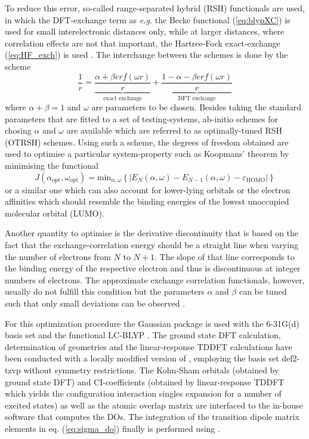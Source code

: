 To reduce this error, so-called range-separated hybrid (RSH) functionals are used, in which the DFT-exchange term as \textit{e.g.} the Becke functional (\ref{eq:blypXC}) is used for small interelectronic distances only, while at larger distances, where correlation effects are not that important, the Hartree-Fock exact-exchange (\ref{eq:HF_exch}) is used \cite{LC-tddft}.
The interchange between the schemes is done by the scheme
\begin{equation}
   \frac 1r = \underbrace{\frac{\alpha +\beta erf(\omega r)}{r}}_{\text{exact exchange}} +\underbrace{\frac{1-\alpha-\beta erf(\omega r)}{r}}_{\text{DFT exchange}}
\end{equation}
where $\alpha+\beta=1$ and $\omega$ are parameters to be chosen.
Besides taking the standard parameters that are fitted to a set of testing-systems, ab-initio schemes for chosing $\alpha$ and $\omega$ are available which are referred to as optimally-tuned RSH (OTRSH) schemes.
Using such a scheme, the degrees of freedom obtained are used to optimise a particular system-property such as Koopmans' theorem by minimising the functional \cite{Bokareva}
\begin{equation}\label{eq:J_ao}
   J(\alpha_\text{opt},\omega_\text{opt})=\text{min}_{\alpha, \omega} \left\{ |E_N(\alpha,\omega)-E_{N-1}(\alpha,\omega)-\varepsilon_\text{HOMO}| \right\}
\end{equation}
or a similar one which can also account for lower-lying orbitals or the electron affinities which should resemble the binding energies of the lowest unoccupied molecular orbital (LUMO).

Another quantity to optimise is the derivative discontinuity \cite{derdis,sanchez,Autschbach} that is based on the fact that the exchange-correlation energy should be a straight line when varying the number of electrons from $N$ to $N+1$.
The slope of that line corresponds to the binding energy of the respective electron and thus is discontinuous at integer numbers of electrons.
The approximate exchange correlation functionals, however, usually do not fulfill this condition but the parameters $\alpha$ and $\beta$ can be tuned such that only small deviations can be observed \cite{Bokareva}.

For this optimization procedure the Gaussian package  \cite{g09} is used with the 6-31G(d) \cite{6-31g,6-31gd} basis set and the functional LC-BLYP \cite{lcblyp}. 
The ground state DFT calculation, determination of geometries and the linear-response TDDFT calculations have been conducted with a locally modified version of  \cite{nwchem}, employing the basis set def2-tzvp \cite{def2tzvp} without symmetry restrictions.
The Kohn-Sham orbitals (obtained by ground state DFT) and CI-coefficients (obtained by linear-response TDDFT which yields the configuration interaction singles expansion for a number of excited states) as well as the atomic overlap matrix are interfaced to the in-house software  \cite{MAgg} that computes the DOs.
The integration of the transition dipole matrix elements in eq. (\ref{eq:sigma_do}) finally is performed using  \cite{ezDyson}.

